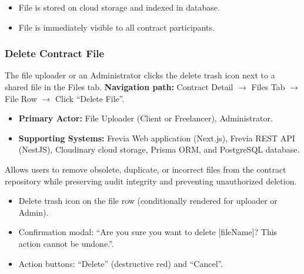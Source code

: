 \begin{itemize}[leftmargin=1.6em,topsep=3pt,itemsep=2pt,parsep=0pt,label=$\bullet$]
      \item File is stored on cloud storage and indexed in database.
      \item File is immediately visible to all contract participants.
\end{itemize}

\subsubsection{ Delete Contract File}

The file uploader or an Administrator clicks the delete trash icon next to a shared file in the Files tab.\newline
\textbf{Navigation path:} Contract Detail $\rightarrow$ Files Tab $\rightarrow$ File Row $\rightarrow$ Click ``Delete File''.


\begin{itemize}[leftmargin=1.6em,topsep=3pt,itemsep=2pt,parsep=0pt,label=$\bullet$]
      \item \textbf{Primary Actor:} File Uploader (Client or Freelancer), Administrator.
      \item \textbf{Supporting Systems:} Frevia Web application (Next.js), Frevia REST API (NestJS), Cloudinary cloud storage, Prisma ORM, and PostgreSQL database.
\end{itemize}

\noindent Allows users to remove obsolete, duplicate, or incorrect files from the contract repository while preserving audit integrity and preventing unauthorized deletion.

\begin{itemize}[leftmargin=1.6em,topsep=3pt,itemsep=2pt,parsep=0pt,label=$\bullet$]
      \item Delete trash icon on the file row (conditionally rendered for uploader or Admin).
      \item Confirmation modal: ``Are you sure you want to delete [fileName]? This action cannot be undone.''.
      \item Action buttons: ``Delete'' (destructive red) and ``Cancel''.
\end{itemize}

